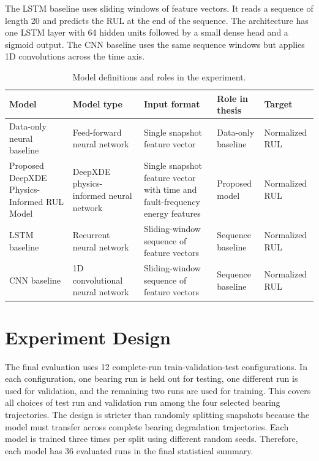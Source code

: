 The LSTM baseline uses sliding windows of feature vectors. It reads a sequence of length 20 and predicts the RUL at the end of the sequence. The architecture has one LSTM layer with 64 hidden units followed by a small dense head and a sigmoid output. The CNN baseline uses the same sequence windows but applies 1D convolutions across the time axis.

\begin{table}[htbp]
    \centering
    \scriptsize
    \renewcommand{\arraystretch}{1.25}
    \caption{Model definitions and roles in the experiment.}
    \label{tab:model_summary}
    \begin{tabularx}{\textwidth}{@{}Y Y Y Y l@{}}
        \toprule
        Model & Model type & Input format & Role in thesis & Target \\
        \midrule
        Data-only neural baseline & Feed-forward neural network & Single snapshot feature vector & Data-only baseline & Normalized RUL \\
        Proposed DeepXDE Physics-Informed RUL Model & DeepXDE physics-informed neural network & Single snapshot feature vector with time and fault-frequency energy features & Proposed model & Normalized RUL \\
        LSTM baseline & Recurrent neural network & Sliding-window sequence of feature vectors & Sequence baseline & Normalized RUL \\
        CNN baseline & 1D convolutional neural network & Sliding-window sequence of feature vectors & Sequence baseline & Normalized RUL \\
        \bottomrule
    \end{tabularx}
\end{table}
\FloatBarrier

\section{Experiment Design}

The final evaluation uses 12 complete-run train-validation-test configurations. In each configuration, one bearing run is held out for testing, one different run is used for validation, and the remaining two runs are used for training. This covers all choices of test run and validation run among the four selected bearing trajectories. The design is stricter than randomly splitting snapshots because the model must transfer across complete bearing degradation trajectories. Each model is trained three times per split using different random seeds. Therefore, each model has 36 evaluated runs in the final statistical summary.

